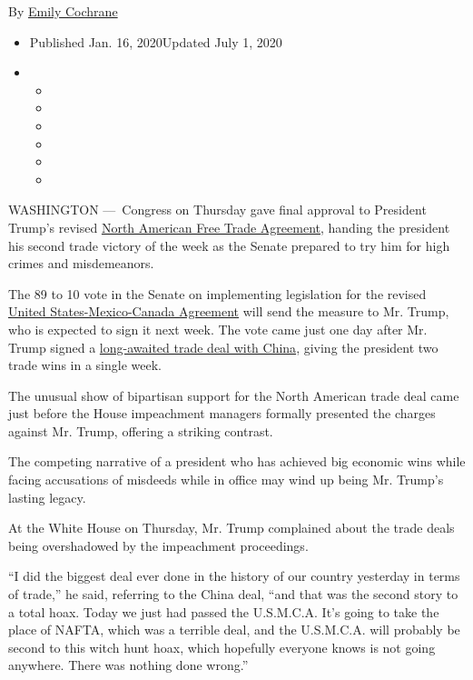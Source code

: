 By \href{https://www.nytimes3xbfgragh.onion/by/emily-cochrane}{Emily
Cochrane}

\begin{itemize}
\item
  Published Jan. 16, 2020Updated July 1, 2020
\item
  \begin{itemize}
  \item
  \item
  \item
  \item
  \item
  \item
  \end{itemize}
\end{itemize}

WASHINGTON ---~Congress on Thursday gave final approval to President
Trump's revised
\href{https://www.nytimes3xbfgragh.onion/2020/07/01/business/economy/usmca-takes-effect.html}{North
American Free Trade Agreement}, handing the president his second trade
victory of the week as the Senate prepared to try him for high crimes
and misdemeanors.

The 89 to 10 vote in the Senate on implementing legislation for the
revised
\href{https://www.nytimes3xbfgragh.onion/2020/07/01/business/economy/usmca-takes-effect.html}{United
States-Mexico-Canada Agreement} will send the measure to Mr. Trump, who
is expected to sign it next week. The vote came just one day after Mr.
Trump signed a
\href{https://www.nytimes3xbfgragh.onion/2020/01/15/business/economy/china-trade-deal.html}{long-awaited
trade deal with China}, giving the president two trade wins in a single
week.

The unusual show of bipartisan support for the North American trade deal
came just before the House impeachment managers formally presented the
charges against Mr. Trump, offering a striking contrast.

The competing narrative of a president who has achieved big economic
wins while facing accusations of misdeeds while in office may wind up
being Mr. Trump's lasting legacy.

At the White House on Thursday, Mr. Trump complained about the trade
deals being overshadowed by the impeachment proceedings.

``I did the biggest deal ever done in the history of our country
yesterday in terms of trade,'' he said, referring to the China deal,
``and that was the second story to a total hoax. Today we just had
passed the U.S.M.C.A. It's going to take the place of NAFTA, which was a
terrible deal, and the U.S.M.C.A. will probably be second to this witch
hunt hoax, which hopefully everyone knows is not going anywhere. There
was nothing done wrong.''

